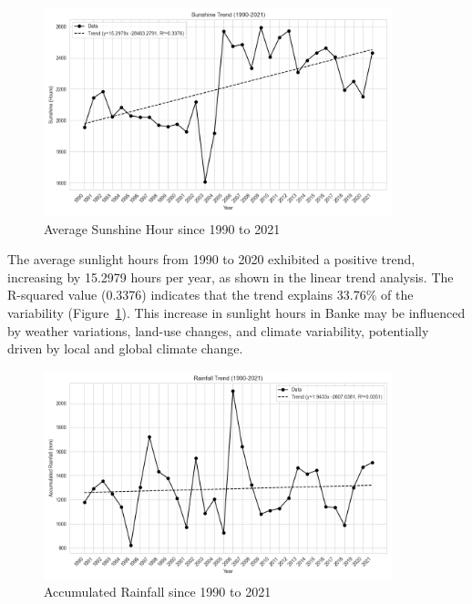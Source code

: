 \begin{figure}[H]
    \centering
    \caption{Average Sunshine Hour since 1990 to 2021} 
    \label{fig:trend_avg_sunshine_hour}
    \includegraphics[width=0.9\textwidth]{images/trend_avg_sunshine_hour.png}
\end{figure}

The average sunlight hours from 1990 to 2020 exhibited a positive trend, increasing by 15.2979 hours per year, as shown in the linear trend analysis. The R-squared value (0.3376) indicates that the trend explains 33.76\% of the variability (Figure~\ref{fig:trend_avg_sunshine_hour}). This increase in sunlight hours in Banke may be influenced by weather variations, land-use changes, and climate variability, potentially driven by local and global climate change.


\begin{figure}[H]
    \centering
    \caption{Accumulated Rainfall since 1990 to 2021} 
    \label{fig:trend_accumulated_rainfall}
    \includegraphics[width=0.9\textwidth]{images/trend_accumulated_rainfall.png}
\end{figure}


